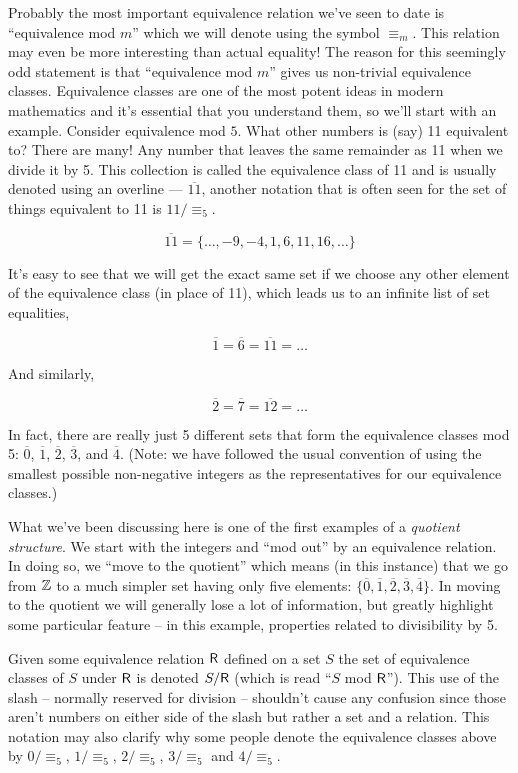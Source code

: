 Probably the most important equivalence relation we've seen to date
is ``equivalence mod $m$'' which we will denote using the symbol $\equiv_m$.
This relation may even be more interesting than
actual equality!   The reason for this seemingly odd statement is that
``equivalence mod $m$'' gives us non-trivial  equivalence classes.  Equivalence
classes are one of the most potent ideas in modern mathematics and it's essential
that you understand them, so we'll start with an example.  Consider equivalence
mod $5$.  What other numbers is (say) 11 equivalent to?  There are many!  Any 
number that leaves the same remainder as 11 when we divide it by 5.  This collection
is called the equivalence class of 11 and is usually denoted using an overline --- 
$\overline{11}$, another notation that is often seen for the set of things equivalent 
to 11 is $11/\equiv_5$. 

\[ \overline{11} = \{ \ldots, -9, -4, 1, 6, 11, 16, \ldots \} \]

It's easy to see that we will get the exact same set if we choose any other element
of the equivalence class (in place of 11), which leads us to an infinite list of set
equalities,

\[   \overline{1} = \overline{6} = \overline{11} = \ldots \]

\noindent And similarly, 

\[   \overline{2} = \overline{7} = \overline{12} = \ldots \]

\noindent In fact, there are really just 5 different sets that form the
equivalence classes mod 5:  $\overline{0}$, $\overline{1}$, $\overline{2}$, $\overline{3}$, 
and $\overline{4}$.  (Note: we have followed the usual convention of using the smallest
 possible non-negative integers as the representatives for our equivalence classes.)

What we've been discussing here is one of the first examples of a 
\emph{quotient structure}.
We start with the integers and ``mod out'' by an equivalence relation.  In doing so, we
``move to the quotient'' which means (in this instance) that we go from ${\mathbb Z}$ to a much simpler set
having only five elements: $\{ \overline{0}, \overline{1}, \overline{2}, \overline{3}, 
\overline{4} \}$.  In moving to the quotient we will generally lose a lot of information, 
but greatly highlight some particular feature -- in this example, properties related to 
divisibility by 5.
 
Given some equivalence relation $\mbox{\textsf R}$ defined on a set $S$ the set of equivalence classes
of $S$ under $\mbox{\textsf R}$ is denoted $S/\mbox{\textsf R}$ (which is read ``$S$ mod $\mbox{\textsf R}$'').  This use of the
slash -- normally reserved for division -- shouldn't cause any confusion since those aren't 
numbers on either side of the slash but rather a set and a relation.  This
notation may also clarify why some people denote the equivalence classes above
by $0/\equiv_5$, $1/\equiv_5$, $2/\equiv_5$, $3/\equiv_5$ and  $4/\equiv_5$.
 

